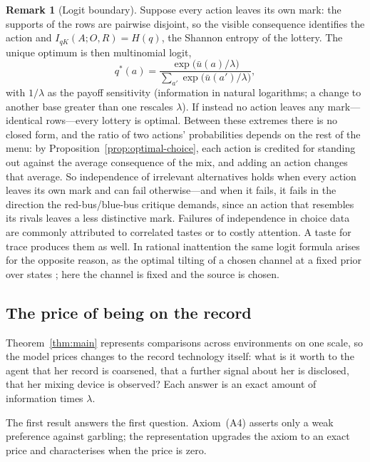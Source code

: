 \documentclass[11pt,a4paper]{article}
\theoremstyle{definition}
\newtheorem{remark}[theorem]{Remark}
\newcommand{\I}{I}
\newcommand{\Sh}{H}
\newcommand{\1}{\mathbf 1}
\begin{document}
\begin{remark}[Logit boundary]\label{rem:logit}
Suppose every action leaves its own mark: the supports of the rows are pairwise disjoint, so the visible
consequence identifies the action and $\I_{qK}(A;O,R)=\Sh(q)$, the Shannon entropy of the lottery.  The unique
optimum is then multinomial logit,
\[
 q^*(a)
 =\frac{\exp\bigl(\bar u(a)/\lambda\bigr)}
 {\sum_{a'}\exp\bigl(\bar u(a')/\lambda\bigr)},
\]
with $1/\lambda$ as the payoff sensitivity (information in natural logarithms; a change to another base greater than one rescales
$\lambda$).  If instead no action leaves any mark---identical rows---every lottery is optimal.  Between these
extremes there is no closed form, and the ratio of two actions' probabilities depends on the rest of the menu:
by Proposition~\ref{prop:optimal-choice}, each action is credited for standing out against the average
consequence of the mix, and adding an action changes that average.  So independence of irrelevant alternatives
holds when every action leaves its own mark and can fail otherwise---and when it fails, it fails in the
direction the red-bus/blue-bus critique demands, since an action that resembles its rivals leaves a less
distinctive mark.
Failures of independence in choice data are commonly attributed to correlated tastes or to costly attention.  A
taste for trace produces them as well.
In rational inattention the same logit formula arises for the opposite reason, as the optimal tilting of a chosen
channel at a fixed prior over states \cite{MatejkaMcKay2015}; here the channel is fixed and the source is chosen.
\end{remark}

\subsection{The price of being on the record}\label{sec:record-price}

Theorem~\ref{thm:main} represents comparisons across environments on one scale, so the model prices changes to
the record technology itself: what is it worth to the agent that her record is coarsened, that a further signal
about her is disclosed, that her mixing device is observed?  Each answer is an exact amount of information times
$\lambda$.

The first result answers the first question.  Axiom~\textup{(A4)} asserts only a weak preference against
garbling; the representation upgrades the axiom to an exact price and characterises when the price is zero.
\end{document}
